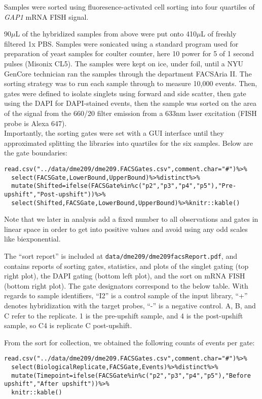 {Samples were sorted using fluoresence-activated cell sorting into four
quartiles of \emph{GAP1} mRNA FISH signal.

90\(\mu\)L of the hybridized samples from above were put onto
410\(\mu\)L of freshly filtered 1x PBS. Samples were sonicated using a
standard program used for preparation of yeast samples for coulter
counter, here 10 power for 5 of 1 second pulses (Misonix CL5). The
samples were kept on ice, under foil, until a NYU GenCore technician ran
the samples through the department FACSAria II. The sorting strategy was
to run each sample through to measure 10,000 events. Then, gates were
defined to isolate singlets using forward and side scatter, then gate
using the DAPI for DAPI-stained events, then the sample was sorted on
the area of the signal from the 660/20 filter emission from a 633nm
laser excitation (FISH probe is Alexa 647).\\
Importantly, the sorting gates were set with a GUI interface until they
approximated splitting the libraries into quartiles for the six samples.
Below are the gate boundaries:

\begin{verbatim}
read.csv("../data/dme209/dme209.FACSGates.csv",comment.char="#")%>%
  select(FACSGate,LowerBound,UpperBound)%>%distinct%>%
  mutate(Shifted=ifelse(FACSGate%in%c("p2","p3","p4","p5"),"Pre-upshift","Post-upshift"))%>%
  select(Shifted,FACSGate,LowerBound,UpperBound)%>%knitr::kable()
\end{verbatim}

Note that we later in analysis add a fixed number to all observations
and gates in linear space in order to get into positive values and avoid
using any odd scales like biexponential.

The ``sort report'' is included at
\texttt{data/dme209/dme209facsReport.pdf}, and contains reports of
sorting gates, statistics, and plots of the singlet gating (top right
plot), the DAPI gating (bottom left plot), and the sort on mRNA FISH
(bottom right plot). The gate designators correspond to the below table.
With regards to sample identifiers, ``I2'' is a control sample of the
input library, ``+'' denotes hybridization with the target probes, ``-''
is a negative control. A, B, and C refer to the replicate. 1 is the
pre-upshift sample, and 4 is the post-upshift sample, so C4 is replicate
C post-upshift.

From the sort for collection, we obtained the following counts of events
per gate:

\begin{verbatim}
read.csv("../data/dme209/dme209.FACSGates.csv",comment.char="#")%>%
  select(BiologicalReplicate,FACSGate,Events)%>%distinct%>%
  mutate(Timepoint=ifelse(FACSGate%in%c("p2","p3","p4","p5"),"Before upshift","After upshift"))%>%
  knitr::kable()
\end{verbatim}

}
